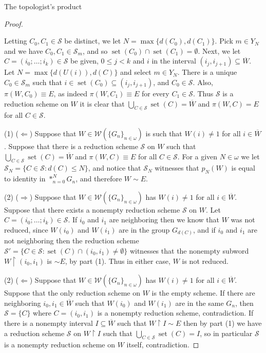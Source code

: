 \documentclass{amsart}
\theoremstyle{definition}\newtheorem{theorem}{Theorem}
\theoremstyle{definition}\newtheorem*{A}{Main Theorem}
\theoremstyle{definition}\newtheorem*{B}{Theorem \ref{elementaryequiv}}
\theoremstyle{definition}\newtheorem*{C}{Theorem \ref{continuous}}
\theoremstyle{definition}\newtheorem*{D}{Theorem \ref{bigisomorphism2}}
\theoremstyle{definition}\newtheorem{bigtheorem}{Main Theorem}
\numberwithin{theorem}{section}
\theoremstyle{definition}\newtheorem{corollary}[theorem]{Corollary}
\theoremstyle{definition}\newtheorem{proposition}[theorem]{Proposition}
\theoremstyle{definition}\newtheorem{definition}[theorem]{Definition}
\theoremstyle{definition}\newtheorem{question}[theorem]{Question}
\theoremstyle{definition}\newtheorem{example}[theorem]{Example}
\theoremstyle{definition}\newtheorem{remark}[theorem]{Remark}
\theoremstyle{definition}\newtheorem{note}[theorem]{Note}
\theoremstyle{definition}\newtheorem{lemma}[theorem]{Lemma}
\theoremstyle{definition}\newtheorem{fact}[theorem]{Fact}
\theoremstyle{definition}\newtheorem{define}[theorem]{Definition}
\theoremstyle{definition}\newtheorem{claim}[theorem]{Claim}
\theoremstyle{definition}\newtheorem{obs}[theorem]{Observation}
\theoremstyle{definition}\newtheorem{definitions}[theorem]{Definitions}
\newcommand{\set}{\operatorname{set}}
\newcommand{\W}{\mathcal{W}}
\begin{document}
\begin{section}{The topologist's product}
\begin{proof}
\begin{center}
\end{center}

\noindent Letting $C_0, C_1 \in \mathcal{S}$ be distinct, we let $N = \max\{d(C_0), d(C_1)\}$.  Pick $m \in Y_N$ and we have $C_0, C_1 \in \mathcal{S}_m$, and so $\set(C_0) \cap \set(C_1) = \emptyset$.  Next, we let $C = (i_0; \ldots; i_k) \in \mathcal{S}$ be given, $0 \leq j < k$ and $i$ in the interval $(i_j, i_{j+1}) \subseteq \overline{W}$.  Let $N = \max\{d(U(i)), d(C)\}$ and select $m \in Y_N$.  There is a unique $C_0 \in \mathcal{S}_m$ such that $i \in \set(C_0) \subseteq (i_j, i_{j+1})$, and $C_0 \in \mathcal{S}$.  Also, $\pi(W, C_0) \equiv E$, as indeed $\pi(W, C_1) \equiv E$ for every $C_1 \in \mathcal{S}$.  Thus $\mathcal{S}$ is a reduction scheme on $W$ it is clear that $\bigcup_{C \in \mathcal{S}} \set(C) = \overline{W}$ and $\pi(W, C) = E$ for all $C \in \mathcal{S}$.

(1)  ($\Leftarrow$)  Suppose that $W \in \W(\{G_n\}_{n \in \omega})$ is such that $W(i) \neq 1$ for all $i \in \overline{W}$.  Suppose that there is a reduction scheme $\mathcal{S}$ on $W$ such that $\bigcup_{C \in \mathcal{S}} \set(C) = \overline{W}$ and $\pi(W, C) \equiv E$ for all $C \in \mathcal{S}$.  For a given $N \in \omega$ we let $\mathcal{S}_N = \{C \in \mathcal{S}: d(C) \leq N\}$, and notice that $\mathcal{S}_N$ witnesses that $p_N(W)$ is equal to identity in $*_{n = 0}^N G_n$, and therefore $W \sim E$.



(2)  ($\Rightarrow$)  Suppose that $W \in \W(\{G_n\}_{n \in \omega})$ has $W(i) \neq 1$ for all $i \in \overline{W}$.  Suppose that there exists a nonempty reduction scheme $\mathcal{S}$ on $W$.  Let $C = (i_0; \ldots; i_k) \in \mathcal{S}$.  If $i_0$ and $i_1$ are neighboring then we know that $W$ was not reduced, since $W(i_0)$ and $W(i_1)$ are in the group $G_{d(C)}$, and if $i_0$ and $i_1$ are not neighboring then the reduction scheme $\mathcal{S}' = \{C \in \mathcal{S}: \set(C) \cap (i_0, i_1) \neq \emptyset\}$ witnesses that the nonempty subword $W \upharpoonright (i_0, i_1)$ is $\sim E$, by part (1).  Thus in either case, $W$ is not reduced.

(2) ($\Leftarrow$)  Suppose that $W \in \W(\{G_n\}_{n \in \omega})$ has $W(i) \neq 1$ for all $i \in \overline{W}$.  Suppose that the only reduction scheme on $W$ is the empty scheme.  If there are neighboring $i_0, i_1 \in \overline{W}$ such that $W(i_0)$ and $W(i_1)$ are in the same $G_n$, then $\mathcal{S} = \{C\}$ where $C = (i_0, i_1)$ is a nonempty reduction scheme, contradiction.  If there is a nonempty interval $I \subseteq \overline{W}$ such that $W \upharpoonright I \sim E$ then by part (1) we have a reduction scheme $\mathcal{S}$ on $W \upharpoonright I$ such that $\bigcup_{C \in \mathcal{S}} \set(C) = I$, so in particular $\mathcal{S}$ is a nonempty reduction scheme on $W$ itself, contradiction.


\end{proof}
\end{section}
\end{document}
